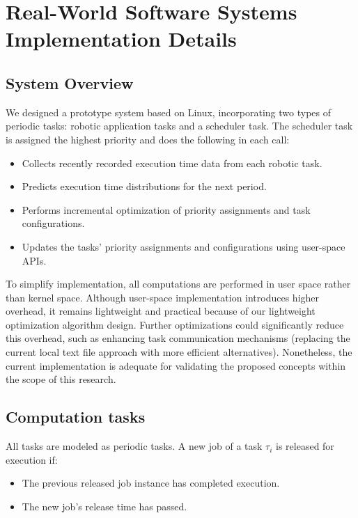 \section{Real-World Software Systems Implementation Details}
\label{section_implementation}

\subsection{System Overview}
We designed a prototype system based on Linux, incorporating two types of periodic tasks: robotic application tasks and a scheduler task.
The scheduler task is assigned the highest priority and does the following in each call:
\begin{itemize}
    \item Collects recently recorded execution time data from each robotic task.
    \item Predicts execution time distributions for the next period.
    \item Performs incremental optimization of priority assignments and task configurations.
    \item Updates the tasks' priority assignments and configurations using user-space APIs.
\end{itemize}

To simplify implementation, all computations are performed in user space rather than kernel space.
Although user-space implementation introduces higher overhead, it remains lightweight and practical because of our lightweight optimization algorithm design.
Further optimizations could significantly reduce this overhead, such as enhancing task communication mechanisms (\eg replacing the current local text file approach with more efficient alternatives).
Nonetheless, the current implementation is adequate for validating the proposed concepts within the scope of this research.


\subsection{Computation tasks}
\label{section_computation_tasks}

All tasks are modeled as periodic tasks.
A new job of a task $\tau_i$ is released for execution if:
\begin{itemize}
    \item The previous released job instance has completed execution.
    \item The new job's release time has passed.
\end{itemize}

